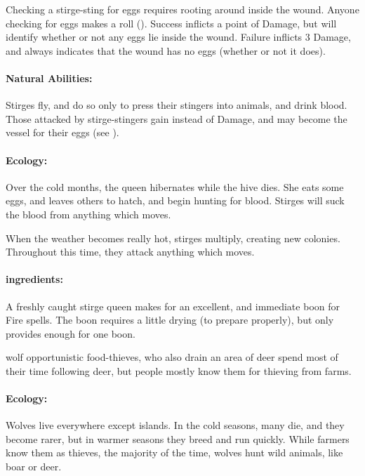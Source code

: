 \begin{multicols}{2}
Checking a stirge-sting for eggs requires rooting around inside the wound.
Anyone checking for eggs makes a  roll (\tn[12]).
Success inflicts a point of Damage, but will identify whether or not any eggs lie inside the wound.
Failure inflicts 3 Damage, and always indicates that the wound has no eggs (whether or not it does).

\paragraph{Natural Abilities:}
Stirges fly, and do so only to press their stingers into animals, and drink blood.
Those attacked by stirge-stingers gain  instead of Damage, and may become the vessel for their eggs (see ).

\paragraph{Ecology:}
Over the cold months, the queen hibernates while the hive dies.
She eats some eggs, and leaves others to hatch, and begin hunting for blood.
Stirges will suck the blood from anything which moves.

When the weather becomes really hot, stirges multiply, creating new colonies.
Throughout this time, they attack anything which moves.

\paragraph{\Glspl{ingredient}:}
A freshly caught stirge queen makes for an excellent, and immediate \gls{boon} for Fire spells.
The \gls{boon} requires a little drying (\tn[5] to prepare properly), but only provides enough for one \gls{boon}.

\stirgeSwarm

  {wolf}%
  {opportunistic food-thieves, who also drain an area of deer}%
spend most of their time following deer, but people mostly know them for thieving from farms.

\paragraph{Ecology:} Wolves live everywhere except islands.
In the cold seasons, many die, and they become rarer, but in warmer seasons they breed and run quickly.
While farmers know them as thieves, the majority of the time, wolves hunt wild animals, like boar or deer.


\end{multicols}
